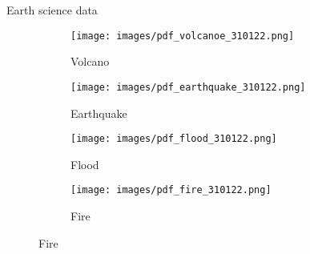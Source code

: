    
   \begin{frame}{Earth science data}
   
   \begin{figure}[t]
       \centering
       \begin{subfigure}{0.20\textwidth}
           \texttt{[image: images/pdf\_volcanoe\_310122.png]}
           \caption{Volcano}
       \end{subfigure}
       \hfill
       \begin{subfigure}{0.20\textwidth}
           \texttt{[image: images/pdf\_earthquake\_310122.png]}
           \caption{Earthquake}
       \end{subfigure}
       \hfill
       \begin{subfigure}{0.20\textwidth}
           \texttt{[image: images/pdf\_flood\_310122.png]}
           \caption{Flood}
       \end{subfigure}
       \hfill
       \begin{subfigure}{0.20\textwidth}
           \texttt{[image: images/pdf\_fire\_310122.png]}
           \caption{Fire}
       \end{subfigure}
       \label{fig:geoscience}
       \vspace{-1.2em}
   \end{figure}
   

\end{frame}
